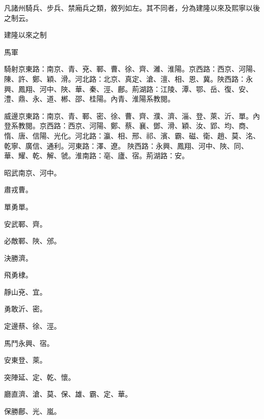 \begin{pinyinscope}
 凡諸州騎兵、步兵、禁廂兵之類，敘列如左。其不同者，分為建隆以來及熙寧以後之制云。



 建隆以來之制



 馬軍



 騎射京東路：南京、青、兗、鄆、曹、徐、齊、濰、淮陽。京西路：西京、河陽、陳、許、鄭、穎、滑。河北路：北京、真定、滄、澶、相、恩、冀。陜西路：永興、鳳翔、河中、陜、華、秦、涇、鄜。荊湖路：江陵、潭、鄂、岳、復、安、澧、鼎、永、道、郴、邵、桂陽。內青、淮陽系教閱。



 威邊京東路：南京、青、鄆、密、徐、曹、齊、濮、濟、淄、登、萊、沂、單。內登系教閱。京西路：西京、河陽、鄭、蔡、襄、鄧、滑、穎、汝、郢、均、商、惰、唐、信陽、光化。河北路：瀛、相、邢、祁、濱、霸、磁、衛、趙、莫、洺、乾寧、廣信、通利。河東路：澤、遼。
 陜西路：永興、鳳翔、河中、陜、同、華、耀、乾、解、虢。淮南路：亳、廬、宿。荊湖路：安。



 昭武南京、河中。



 肅戎曹。



 單勇單。



 安武鄆、齊。



 必敵鄆、陜、邠。



 決勝濟。



 飛勇棣。



 靜山兗、宜。



 勇敢沂、密。



 定邊蔡、徐、涇。



 馬鬥永興、宿。



 安東登、萊。



 突陣延、定、乾、懷。



 廳直濟、滄、莫、保、雄、霸、定、華。



 保勝鄜、光、嵐。




\end{pinyinscope}
